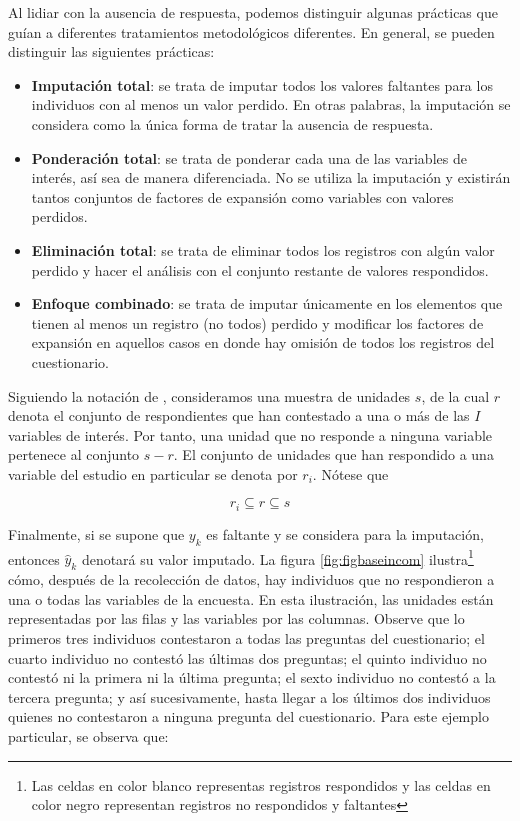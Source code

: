 \documentclass[
  12pt,
]{book}
\providecommand{\tightlist}{%
  \setlength{\itemsep}{0pt}\setlength{\parskip}{0pt}}
\begin{document}
Al lidiar con la ausencia de respuesta, podemos distinguir algunas prácticas que guían a diferentes tratamientos metodológicos diferentes. En general, se pueden distinguir las siguientes prácticas:

\begin{itemize}
\tightlist
\item
  \textbf{Imputación total}: se trata de imputar todos los valores faltantes para los individuos con al menos un valor perdido. En otras palabras, la imputación se considera como la única forma de tratar la ausencia de respuesta.
\item
  \textbf{Ponderación total}: se trata de ponderar cada una de las variables de interés, así sea de manera diferenciada. No se utiliza la imputación y existirán tantos conjuntos de factores de expansión como variables con valores perdidos.
\item
  \textbf{Eliminación total}: se trata de eliminar todos los registros con algún valor perdido y hacer el análisis con el conjunto restante de valores respondidos.
\item
  \textbf{Enfoque combinado}: se trata de imputar únicamente en los elementos que tienen al menos un registro (no todos) perdido y modificar los factores de expansión en aquellos casos en donde hay omisión de todos los registros del cuestionario.
\end{itemize}

Siguiendo la notación de \citet{Sarndal_Lundstrom_2006}, consideramos una muestra de unidades \(s\), de la cual \(r\) denota el conjunto de respondientes que han contestado a una o más de las \(I\) variables de interés. Por tanto, una unidad que no responde a ninguna variable pertenece al conjunto \(s-r\). El conjunto de unidades que han respondido a una variable del estudio en particular se denota por \(r_i\). Nótese que

\[
r_i\subseteq r \subseteq s
\]

Finalmente, si se supone que \(y_k\) es faltante y se considera para la imputación, entonces \(\hat{y}_k\) denotará su valor imputado. La figura \ref{fig:figbaseincom} ilustra\footnote{Las celdas en color blanco representas registros respondidos y las celdas en color negro representan registros no respondidos y faltantes} cómo, después de la recolección de datos, hay individuos que no respondieron a una o todas las variables de la encuesta. En esta ilustración, las unidades están representadas por las filas y las variables por las columnas. Observe que lo primeros tres individuos contestaron a todas las preguntas del cuestionario; el cuarto individuo no contestó las últimas dos preguntas; el quinto individuo no contestó ni la primera ni la última pregunta; el sexto individuo no contestó a la tercera pregunta; y así sucesivamente, hasta llegar a los últimos dos individuos quienes no contestaron a ninguna pregunta del cuestionario. Para este ejemplo particular, se observa que:
\end{document}
